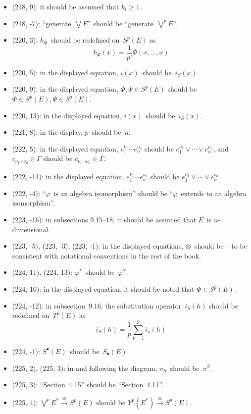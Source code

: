\documentclass[letterpaper,12pt]{article}
\newcommand{\iso}{\cong}
\newcommand{\mult}{\cdot}
\newcommand{\tprod}{\otimes}
\newcommand{\smprod}{\vee}
\newcommand{\bigsmprod}{\bigvee}
\begin{document}
\begin{itemize}
\item (218, 9): it should be assumed that \(k_i\ge 1\).
\item (218, -7): ``generate~\(\bigsmprod E\)'' should be ``generate~\(\bigsmprod^p E\)''.
\item (220, 3): \(h_{\Phi}\)~should be redefined on~\(S^p(E)\) as
\[h_{\Phi}(x)=\frac{1}{p!}\Phi(x,\ldots,x)\]
\item (220, 5): in the displayed equation, \(i(x)\)~should be~\(i_S(x)\).
\item (220, 9): in the displayed equation, \(\Phi,\Psi\in S^p(E)\) should be \(\Phi\in S^p(E),\Psi\in S^q(E)\).
\item (220, 13): in the displayed equation, \(i(x)\)~should be~\(i_S(x)\).
\item (221, 8): in the display, \(p\)~should be~\(n\).
\item (222, 5): in the displayed equation, \(e_1^{\nu_1}\cdots e_n^{\nu_n}\) should be \(e_1^{\nu_1}\smprod\cdots\smprod e_n^{\nu_n}\), and \(c_{\nu_1\cdots\nu_p}\in\Gamma\) should be \(c_{\nu_1\cdots\nu_n}\in\Gamma\).
\item (222, -11): in the displayed equation, \(e_1^{\nu_1}\cdots e_n^{\nu_n}\) should be \(e_1^{\nu_1}\smprod\cdots\smprod e_n^{\nu_n}\).
\item (222, -4): ``\(\varphi\)~is an algebra isomorphism'' should be ``\(\varphi\)~extends to an algebra isomorphism''.
\item (223, -16): in subsections 9.15--18, it should be assumed that \(E\)~is \(n\)-dimensional.
\item (223, -5), (223, -3), (223, -1): in the displayed equations, \(\tprod\)~should be~\(\mult\) to be consistent with notational conventions in the rest of the book.
\item (224, 11), (224, 13): \(\varphi^*\)~should be~\(\varphi^S\).
\item (224, 16): in the displayed equation, it should be noted that \(\Phi\in S^p(E)\).
\item (224, -12): in subsection~9.16, the substitution operator~\(i_S(h)\) should be redefined on~\(T^p(E)\) as
\[i_S(h)=\frac{1}{p}\sum_{\nu=1}^p i_{\nu}(h)\]
\item (224, -1): \(S^{\bullet}(E)\)~should be~\(S_{\bullet}(E)\).
\item (225, 2), (225, 3): in and following the diagram, \(\pi_S\)~should be~\(\pi^S\).
\item (225, 3): ``Section~4.15'' should be ``Section~4.11''.
\item (225, 4): \(\bigsmprod^p E^*\stackrel{\iso}{\to}S^p(E)\) should be \(Y^p(E^*)\stackrel{\iso}{\to}S^p(E)\).

\end{itemize}
\end{document}
